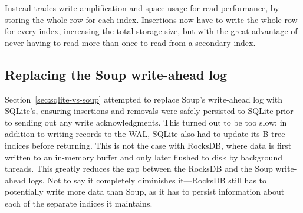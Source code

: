 Instead  trades write amplification and space usage for
read performance, by storing the whole row for each index. Insertions now have
to write the whole row for every index, increasing the total storage size, but
with the great advantage of never having to read more than once to read from a
secondary index.

\subsection{Replacing the Soup write-ahead log}

Section~\ref{sec:sqlite-vs-soup} attempted to replace Soup's write-ahead log
with SQLite's, ensuring insertions and removals were safely persisted to SQLite
prior to sending out any write acknowledgments. This turned out to be too slow:
in addition to writing records to the WAL, SQLite also had to update its B-tree
indices before returning. This is not the case with RocksDB, where data is first
written to an in-memory buffer and only later flushed to disk by background
threads. This greatly reduces the gap between the RocksDB and the Soup
write-ahead logs. Not to say it completely diminishes it---RocksDB still has to
potentially write more data than Soup, as it has to persist information about
each of the separate indices it maintains.
